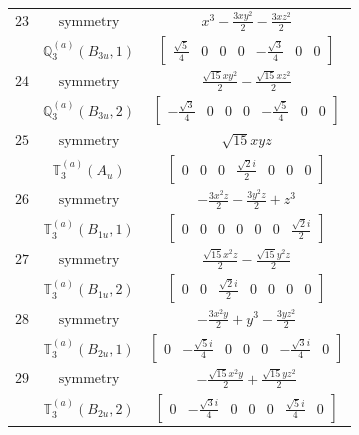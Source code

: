 \documentclass[fleqn,8pt,landscape]{jsarticle}
\begin{document}
\begin{longtable}{ccc}
$ 23 $ & $ \text{symmetry} $ & $ x^{3} - \frac{3 x y^{2}}{2} - \frac{3 x z^{2}}{2} $ \\
$  $ & $ \mathbb{Q}_{3}^{(a)}(B_{3u},1) $ & $ \begin{bmatrix} \frac{\sqrt{5}}{4} & 0 & 0 & 0 & - \frac{\sqrt{3}}{4} & 0 & 0 \end{bmatrix} $ \\ \hline
$ 24 $ & $ \text{symmetry} $ & $ \frac{\sqrt{15} x y^{2}}{2} - \frac{\sqrt{15} x z^{2}}{2} $ \\
$  $ & $ \mathbb{Q}_{3}^{(a)}(B_{3u},2) $ & $ \begin{bmatrix} - \frac{\sqrt{3}}{4} & 0 & 0 & 0 & - \frac{\sqrt{5}}{4} & 0 & 0 \end{bmatrix} $ \\ \hline
$ 25 $ & $ \text{symmetry} $ & $ \sqrt{15} x y z $ \\
$  $ & $ \mathbb{T}_{3}^{(a)}(A_{u}) $ & $ \begin{bmatrix} 0 & 0 & 0 & \frac{\sqrt{2} i}{2} & 0 & 0 & 0 \end{bmatrix} $ \\ \hline
$ 26 $ & $ \text{symmetry} $ & $ - \frac{3 x^{2} z}{2} - \frac{3 y^{2} z}{2} + z^{3} $ \\
$  $ & $ \mathbb{T}_{3}^{(a)}(B_{1u},1) $ & $ \begin{bmatrix} 0 & 0 & 0 & 0 & 0 & 0 & \frac{\sqrt{2} i}{2} \end{bmatrix} $ \\ \hline
$ 27 $ & $ \text{symmetry} $ & $ \frac{\sqrt{15} x^{2} z}{2} - \frac{\sqrt{15} y^{2} z}{2} $ \\
$  $ & $ \mathbb{T}_{3}^{(a)}(B_{1u},2) $ & $ \begin{bmatrix} 0 & 0 & \frac{\sqrt{2} i}{2} & 0 & 0 & 0 & 0 \end{bmatrix} $ \\ \hline
$ 28 $ & $ \text{symmetry} $ & $ - \frac{3 x^{2} y}{2} + y^{3} - \frac{3 y z^{2}}{2} $ \\
$  $ & $ \mathbb{T}_{3}^{(a)}(B_{2u},1) $ & $ \begin{bmatrix} 0 & - \frac{\sqrt{5} i}{4} & 0 & 0 & 0 & - \frac{\sqrt{3} i}{4} & 0 \end{bmatrix} $ \\ \hline
$ 29 $ & $ \text{symmetry} $ & $ - \frac{\sqrt{15} x^{2} y}{2} + \frac{\sqrt{15} y z^{2}}{2} $ \\
$  $ & $ \mathbb{T}_{3}^{(a)}(B_{2u},2) $ & $ \begin{bmatrix} 0 & - \frac{\sqrt{3} i}{4} & 0 & 0 & 0 & \frac{\sqrt{5} i}{4} & 0 \end{bmatrix} $ \\ \hline

\end{longtable}
\end{document}
